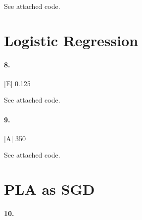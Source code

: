\documentclass[10pt,letter]{article}
\begin{document}
	See attached code. 

\section*{Logistic Regression}

\paragraph{8.} [E] 0.125

	See attached code. 

\paragraph{9.} [A] 350

	See attached code. 

\section*{PLA as SGD}

\paragraph{10.} 
\end{document}
